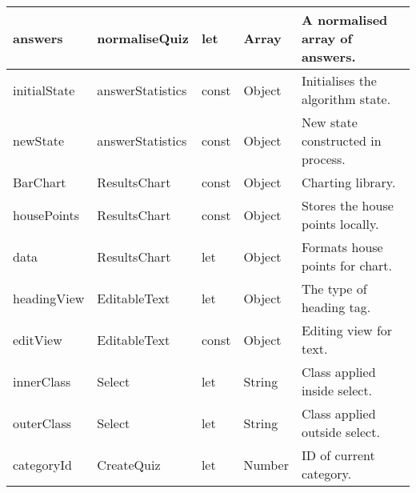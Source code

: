 \begin{table}[]
\begin{tabular}{|l|l|l|l|l|}
answers                             & normaliseQuiz                        & let                                & Array                                & A normalised array of answers.        \\ \hline
initialState                        & answerStatistics                     & const                              & Object                               & Initialises the algorithm state.      \\ \hline
newState                            & answerStatistics                     & const                              & Object                               & New state constructed in process.     \\ \hline
BarChart                            & ResultsChart                         & const                              & Object                               & Charting library.                     \\ \hline
housePoints                         & ResultsChart                         & const                              & Object                               & Stores the house points locally.      \\ \hline
data                                & ResultsChart                         & let                                & Object                               & Formats house points for chart.       \\ \hline
headingView                         & EditableText                         & let                                & Object                               & The type of heading tag.              \\ \hline
editView                            & EditableText                         & const                              & Object                               & Editing view for text.                \\ \hline
innerClass                          & Select                               & let                                & String                               & Class applied inside select.          \\ \hline
outerClass                          & Select                               & let                                & String                               & Class applied outside select.         \\ \hline
categoryId                          & CreateQuiz                           & let                                & Number                               & ID of current category.               \\ \hline

\end{tabular}
\end{table}

